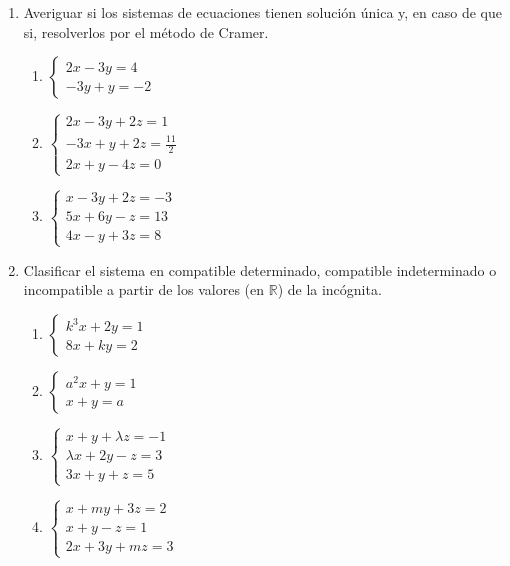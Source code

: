 \documentclass[a4paper]{article}
\newcommand{\exercise}{\item}
\begin{document}
\begin{enumerate}
\begin{multicols}{2}
\begin{enumerate} [label=(\alph*)]
	\end{enumerate}
	\end{multicols}
	\exercise Averiguar si los sistemas de ecuaciones tienen solución única y, en caso de que si, resolverlos por el método de Cramer.
	\begin{multicols}{3}
	\begin{enumerate} [label=(\alph*)]
		\item $\left\{\begin{matrix} 2x-3y=4 \\ -3y+y=-2 \end{matrix}\right.$
		\item $\left\{\begin{matrix} 2x-3y+2z=1 \\ -3x+y+2z=\frac{11}{2} \\ 2x+y-4z=0 \end{matrix}\right.$
		\item $\left\{\begin{matrix} x-3y+2z=-3 \\ 5x+6y-z=13 \\ 4x-y+3z=8 \end{matrix}\right.$
	\end{enumerate}
	\end{multicols}
	\exercise Clasificar el sistema en compatible determinado, compatible indeterminado o incompatible a partir de los valores (en $\mathbb{R}$) de la incógnita.
	\begin{multicols}{3}
	\begin{enumerate} [label=(\alph*)]
		\item $\left\{\begin{matrix} k^3x+2y=1 \\ 8x+ky=2 \end{matrix}\right.$
		\item $\left\{\begin{matrix} a^2x+y=1 \\ x+y=a \end{matrix}\right.$
		\item $\left\{\begin{matrix} x+y+\lambda z=-1 \\ \lambda x+2y-z=3 \\ 3x+y+z=5 \end{matrix}\right.$
		\item $\left\{\begin{matrix} x+my+3z=2 \\ x+y-z=1 \\ 2x+3y+mz=3 \end{matrix}\right.$

\end{enumerate}
\end{multicols}
\end{enumerate}
\end{document}
